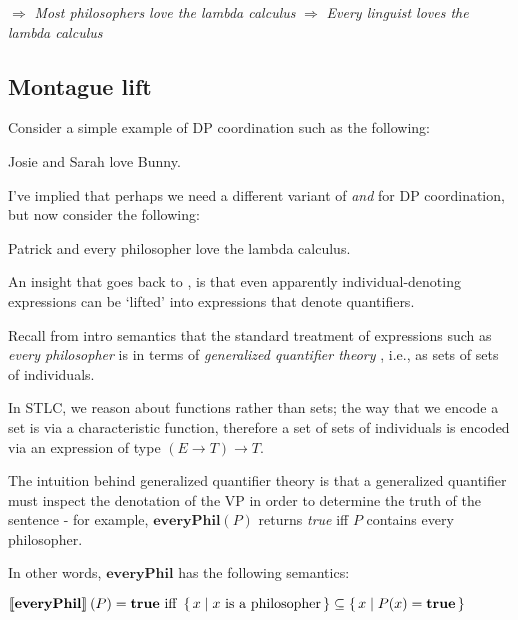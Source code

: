 \documentclass[letterpaper,parskip=half]{scrartcl}
\begin{document}
\begin{exe}
\ex \(\Rightarrow\) \emph{Most philosophers love the lambda calculus}
\ex \(\Rightarrow\) \emph{Every linguist loves the lambda calculus}
\label{orgb2fa432}
\end{exe}

\subsection{Montague lift}
\label{sec:org08698d8}

Consider a simple example of DP coordination such as the following:

\begin{exe}
\ex Josie and Sarah love Bunny.
\label{orga7b9da5}
\end{exe}

I've implied that perhaps we need a different variant of \emph{and} for DP coordination, but now consider the following:

\begin{exe}
\ex Patrick and every philosopher love the lambda calculus.
\label{org6d74515}
\end{exe}

An insight that goes back to \autocite{Montague1973}, is that even apparently individual-denoting expressions can be `lifted' into expressions that denote quantifiers.

Recall from intro semantics that the standard treatment of expressions such as \emph{every philosopher} is in terms of \emph{generalized quantifier theory} \autocite{BarwiseCooper1981}, i.e., as sets of sets of individuals.

In STLC, we reason about functions rather than sets; the way that we encode a set is via a characteristic function, therefore a set of sets of individuals is encoded via an expression of type \((E \to T) \to T\). 

The intuition behind generalized quantifier theory is that a generalized quantifier must inspect the denotation of the VP in order to determine the truth of the sentence - for example, \(\mathbf{everyPhil}(P)\) returns \emph{true} iff \(P\) contains every philosopher.

In other words, \(\mathbf{everyPhil}\) has the following semantics:

\begin{exe}
\ex \(\eval*{\mathbf{everyPhil}}(P) = \mathbf{true}\text{ iff  }\set{x | x\text{ is a philosopher} } \subseteq \set{x | P(x) = \mathbf{true}}\)
\label{org4268fc0}
\end{exe}
\end{document}

